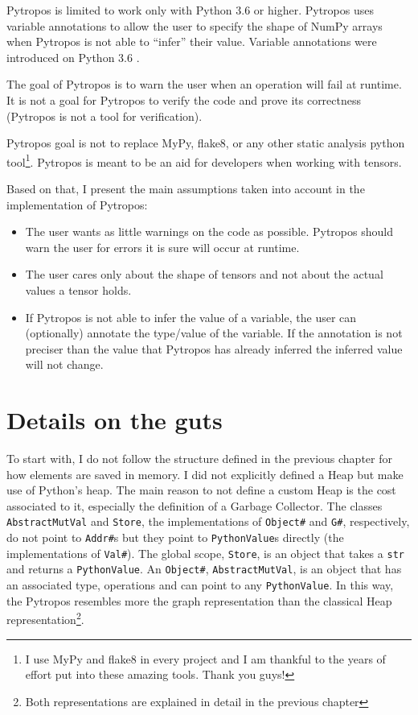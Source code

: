 Pytropos is limited to work only with Python 3.6 or higher. Pytropos
uses variable annotations to allow the user to specify the shape of
NumPy arrays when Pytropos is not able to \enquote{infer} their value.
Variable annotations were introduced on Python 3.6 \autocite{pep526}.

The goal of Pytropos is to warn the user when an operation will fail at
runtime. It is not a goal for Pytropos to verify the code and prove its
correctness (Pytropos is not a tool for verification).

Pytropos goal is not to replace MyPy, flake8, or any other static
analysis python tool\footnote{I use MyPy and flake8 in every project and
  I am thankful to the years of effort put into these amazing tools.
  Thank you guys!}. Pytropos is meant to be an aid for developers when
working with tensors.

Based on that, I present the main assumptions taken into account in the
implementation of Pytropos:

\begin{itemize}
\tightlist
\item
  The user wants as little warnings on the code as possible. Pytropos
  should warn the user for errors it is sure will occur at runtime.
\item
  The user cares only about the shape of tensors and not about the
  actual values a tensor holds.
\item
  If Pytropos is not able to infer the value of a variable, the user can
  (optionally) annotate the type/value of the variable. If the
  annotation is not preciser than the value that Pytropos has already
  inferred the inferred value will not change.
\end{itemize}

\section{Details on the guts}\label{details-on-the-guts}

To start with, I do not follow the structure defined in the previous
chapter for how elements are saved in memory. I did not explicitly
defined a Heap but make use of Python's heap. The main reason to not
define a custom Heap is the cost associated to it, especially the
definition of a Garbage Collector. The classes \texttt{AbstractMutVal}
and \texttt{Store}, the implementations of \texttt{Object\#} and
\texttt{G\#}, respectively, do not point to \texttt{Addr\#}s but they
point to \texttt{PythonValue}s directly (the implementations of
\texttt{Val\#}). The global scope, \texttt{Store}, is an object that
takes a \texttt{str} and returns a \texttt{PythonValue}. An
\texttt{Object\#}, \texttt{AbstractMutVal}, is an object that has an
associated type, operations and can point to any \texttt{PythonValue}.
In this way, the Pytropos resembles more the graph representation than
the classical Heap representation\footnote{Both representations are
  explained in detail in the previous chapter}.

